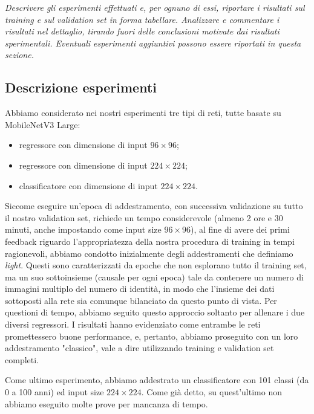 \emph{Descrivere gli esperimenti effettuati e, per ognuno di essi, riportare i risultati sul training e sul validation set in forma tabellare. Analizzare e commentare i risultati nel dettaglio, tirando fuori delle conclusioni motivate dai risultati sperimentali. Eventuali esperimenti aggiuntivi possono essere riportati in questa sezione.}

\subsection{Descrizione esperimenti}

\begin{comment}
    3 esperimenti:
    - regressore 224x244
    - classificatore 224x224
    - regressore 96x96
    Come cosa aggiuntiva, epoche non full che fanno comunque paura
\end{comment}

Abbiamo considerato nei nostri esperimenti tre tipi di reti, tutte basate su MobileNetV3 Large:
\begin{itemize}
    \item regressore con dimensione di input $96 \times 96$;
    \item regressore con dimensione di input $224 \times 224$;
    \item classificatore con dimensione di input $224 \times 224$.
\end{itemize}

Siccome eseguire un'epoca di addestramento, con successiva validazione su tutto il nostro validation set, richiede un tempo considerevole (almeno 2 ore e 30 minuti, anche impostando come input size $96 \times 96$), al fine di avere dei primi feedback riguardo l'appropriatezza della nostra procedura di training in tempi ragionevoli, abbiamo condotto inizialmente degli addestramenti che definiamo \emph{light}. Questi sono caratterizzati da epoche che non esplorano tutto il training set, ma un suo sottoinsieme (causale per ogni epoca) tale da contenere un numero di immagini multiplo del numero di identità, in modo che l'insieme dei dati sottoposti alla rete sia comunque bilanciato da questo punto di vista.
Per questioni di tempo, abbiamo seguito questo approccio soltanto per allenare i due diversi regressori. I risultati hanno evidenziato come entrambe le reti promettessero buone performance, e, pertanto, abbiamo proseguito con un loro addestramento "classico", vale a dire utilizzando training e validation set completi.

Come ultimo esperimento, abbiamo addestrato un classificatore con 101 classi (da 0 a 100 anni) ed input size $224 \times 224$. Come già detto, su quest'ultimo non abbiamo eseguito molte prove per mancanza di tempo.

